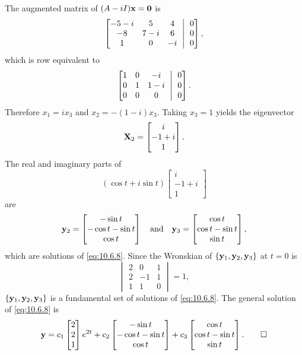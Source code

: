 \begin{solution}
The augmented  matrix of $(A-iI)\mathbf{x}=\mathbf{0}$ is
\[
\amatrix{-5-i&5&4\\-8&7-i&6\\1&0&-i}{0\\0\\0},
\]
which is row equivalent to
\[
\amatrix{1&0&-i\\0&1&1-i\\0&0&0}{0\\0\\0}.
\]
Therefore $x_1=ix_3$ and $x_2=-(1-i)x_3$. Taking $x_3=1$ yields
the eigenvector
\[
\mathbf{X}_2=\begin{bmatrix}i\\-1+i\\ 1\end{bmatrix}.
\]
The real and imaginary parts of
\[
(\cos t+i\sin t)\begin{bmatrix}i\\-1+i\\1\end{bmatrix}
\]
 are
\[
\mathbf{y}_2=
\begin{bmatrix}-\sin t\\-\cos t-\sin t\\\cos t\end{bmatrix}
\quad\text{and}\quad
\mathbf{y}_3=\begin{bmatrix}\cos t\\\cos t-\sin t\\\sin t\end{bmatrix},
 \]
which are solutions of  \eqref{eq:10.6.8}.
Since the  Wronskian of $\{\mathbf{y}_1,\mathbf{y}_2,\mathbf{y}_3\}$
at $t=0$  is
\[
\begin{vmatrix}2&0&1\\2&-1&1\\1&1&0\end{vmatrix}=1,
\]
 $\{\mathbf{y}_1,\mathbf{y}_2,\mathbf{y}_3\}$ is a
fundamental set of solutions of \eqref{eq:10.6.8}. The general solution of
\eqref{eq:10.6.8} is
\[
\mathbf{y}=c_1 \begin{bmatrix}2\\2\\1\end{bmatrix}e^{2t}
+c_2\begin{bmatrix}-\sin t\\-\cos t-\sin t\\\cos t\end{bmatrix}
+c_3\begin{bmatrix}\cos t\\\cos t-\sin t\\\sin t\end{bmatrix}.\qedhere
\]
\end{solution}

